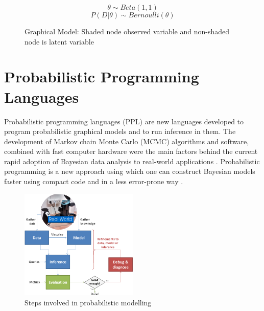 \noindent
\begin{figure}[htp]

\begin{minipage}{0.3\textwidth}
\centering
{}
\end{minipage}%
\begin{minipage}{0.7\textwidth}
\begin{equation*}
	\theta \sim Beta (1,1) 
\end{equation*}
\begin{equation*}
	P (D|\theta) \sim Bernoulli (\theta)
\end{equation*}
\end{minipage}
\caption[Graphical Model]{Graphical Model: Shaded node observed variable and non-shaded node is latent variable}
\label{fig:pgm}
\end{figure}

\section{Probabilistic Programming Languages}

Probabilistic programming languages (PPL) are new languages developed to program probabilistic graphical models and to run inference in them. The development of Markov chain Monte Carlo  (MCMC) algorithms and software, combined with fast computer hardware were the main factors behind the current rapid adoption of Bayesian data analysis to real-world applications \citep{kruschke2014doing}. Probabilistic programming is a new approach using which one can construct Bayesian models faster using compact code and in a less error-prone way \citep{dippl, luttinen_bayespy_2014}. 


\begin{figure}[htp]
\centering
\includegraphics[width=0.5\textwidth]{pictures/Lifecycle.png}
\caption[Steps involved in probabilistic modelling ]{Steps involved in probabilistic modelling  \cite{winn2016} }
\label{fig:steps}
\end{figure}


